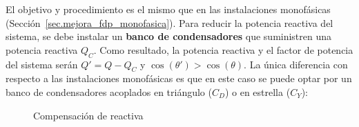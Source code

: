 		El objetivo y procedimiento es el mismo que en las instalaciones monofásicas (Sección~\ref{sec.mejora_fdp_monofasica}). Para reducir la potencia reactiva del sistema, se debe instalar un \textbf{banco de condensadores} que suministren una potencia reactiva $Q_C$. Como resultado, la potencia reactiva y el factor de potencia del sistema serán $Q' = Q - Q_C$ y $\cos(\theta') > \cos (\theta)$. La única diferencia con respecto a las instalaciones monofásicas es que en este caso se puede optar por un banco de condensadores acoplados en triángulo ($C_D$) o en estrella ($C_Y$):
		\begin{figure}[H]
		    \centering
		    \hfil
		    \caption{Compensación de reactiva}
		\end{figure}
